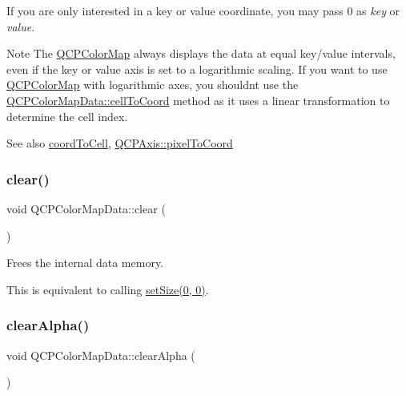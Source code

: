 If you are only interested in a key or value coordinate, you may pass 0 as {\itshape key} or {\itshape value}.

\begin{DoxyNote}{Note}
The \hyperlink{class_q_c_p_color_map}{Q\+C\+P\+Color\+Map} always displays the data at equal key/value intervals, even if the key or value axis is set to a logarithmic scaling. If you want to use \hyperlink{class_q_c_p_color_map}{Q\+C\+P\+Color\+Map} with logarithmic axes, you shouldn\textquotesingle{}t use the \hyperlink{class_q_c_p_color_map_data_af1a36385c78ab624cd617065602408b6}{Q\+C\+P\+Color\+Map\+Data\+::cell\+To\+Coord} method as it uses a linear transformation to determine the cell index.
\end{DoxyNote}
\begin{DoxySeeAlso}{See also}
\hyperlink{class_q_c_p_color_map_data_aca5b29e0ca2f299c9060fc6e1f74d0c8}{coord\+To\+Cell}, \hyperlink{class_q_c_p_axis_a536ef8f624cac59b6b6fdcb495723c57}{Q\+C\+P\+Axis\+::pixel\+To\+Coord} 
\end{DoxySeeAlso}
\mbox{\label{class_q_c_p_color_map_data_a9910ba830e96955bd5c8e5bef1e77ef3}} 
\subsubsection{\texorpdfstring{clear()}{clear()}}
{\footnotesize\ttfamily void Q\+C\+P\+Color\+Map\+Data\+::clear (\begin{DoxyParamCaption}{ }\end{DoxyParamCaption})}

Frees the internal data memory.

This is equivalent to calling \hyperlink{class_q_c_p_color_map_data_a0d9ff35c299d0478b682bfbcdd9c097e}{set\+Size(0, 0)}. \mbox{\label{class_q_c_p_color_map_data_a14d08b9c3720cd719400079b86d3906b}} 
\subsubsection{\texorpdfstring{clear\+Alpha()}{clearAlpha()}}
{\footnotesize\ttfamily void Q\+C\+P\+Color\+Map\+Data\+::clear\+Alpha (\begin{DoxyParamCaption}{ }\end{DoxyParamCaption})}

